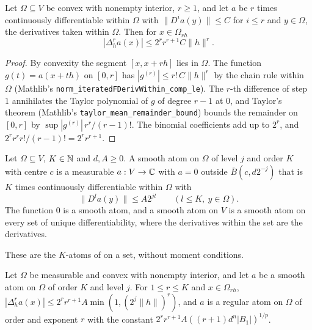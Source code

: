 \begin{lemma}
\label{lem:convex-differences}
\leanok
{}
Let $\Omega \subseteq V$ be convex with nonempty interior, $r \geq 1$, and let $a$ be $r$ times
continuously differentiable within $\Omega$ with $\|D^i a(y)\| \leq C$ for $i \leq r$ and
$y \in \Omega$, the derivatives taken within $\Omega$. Then for $x \in \Omega_{rh}$
\[
  |\Delta_h^r a(x)| \leq 2^r r^{r+1} C \|h\|^r .
\]
\end{lemma}

\begin{proof}
\leanok
By convexity the segment $[x, x + rh]$ lies in $\Omega$. The function $g(t) = a(x + th)$ on
$[0, r]$ has $|g^{(r)}| \leq r!\, C \|h\|^r$ by the chain rule within $\Omega$ (Mathlib's
\texttt{norm\_iteratedFDerivWithin\_comp\_le}). The $r$-th difference of step $1$ annihilates the
Taylor polynomial of $g$ of degree $r - 1$ at $0$, and Taylor's theorem (Mathlib's
\texttt{taylor\_mean\_remainder\_bound}) bounds the remainder on $[0, r]$ by
$\sup |g^{(r)}|\, r^r / (r-1)!$. The binomial coefficients add up to $2^r$, and
$2^r r^r r! / (r - 1)! = 2^r r^{r+1}$.
\end{proof}

\begin{definition}
\label{def:smooth-atoms}
\leanok
{}
Let $\Omega \subseteq V$, $K \in \mathbb{N}$ and $d, A \geq 0$. A smooth atom on $\Omega$ of level $j$
and order $K$ with centre $c$ is a measurable $a : V \to \mathbb{C}$ with $a = 0$ outside
$\overline{B}(c, d 2^{-j})$ that is $K$ times continuously differentiable within $\Omega$ with
\[
  \|D^l a(y)\| \leq A 2^{jl} \qquad (l \leq K,\ y \in \Omega).
\]
The function $0$ is a smooth atom, and a smooth atom on $V$ is a smooth atom on every set of
unique differentiability, where the derivatives within the set are the derivatives.
\end{definition}

These are the $K$-atoms of \cite[Definition 1.3]{SchneiderVybiral} on a set, without moment
conditions.

\begin{lemma}
\label{lem:smooth-atoms-regular}
\leanok
{}
Let $\Omega$ be measurable and convex with nonempty interior, and let $a$ be a smooth atom on
$\Omega$ of order $K$ and level $j$. For $1 \leq r \leq K$ and $x \in \Omega_{rh}$,
$|\Delta_h^r a(x)| \leq 2^r r^{r+1} A \min(1, (2^j \|h\|)^r)$, and $a$ is a regular atom on
$\Omega$ of order and exponent $r$ with the constant
$2^r r^{r+1} A ((r + 1) d^n |B_1|)^{1/p}$.
\end{lemma}

